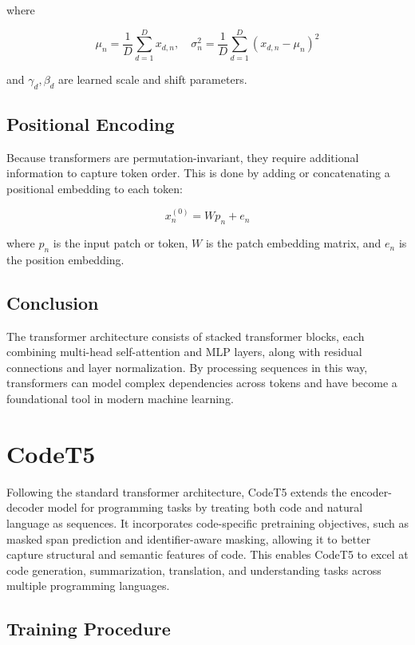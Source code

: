 \documentclass{article}
\begin{document}
where

\[
\mu_n = \frac{1}{D} \sum_{d=1}^D x_{d,n}, \quad \sigma_n^2 = \frac{1}{D} \sum_{d=1}^D (x_{d,n} - \mu_n)^2
\]

and \( \gamma_d, \beta_d \) are learned scale and shift parameters.

\subsection{Positional Encoding}

Because transformers are permutation-invariant, they require additional information to capture token order. This is done by adding or concatenating a positional embedding to each token:

\[
x_n^{(0)} = W p_n + e_n
\]

where \( p_n \) is the input patch or token, \( W \) is the patch embedding matrix, and \( e_n \) is the position embedding. \cite{turner2024introductiontransformers}

\subsection{Conclusion}

The transformer architecture consists of stacked transformer blocks, each combining multi-head self-attention and MLP layers, along with residual connections and layer normalization. By processing sequences in this way, transformers can model complex dependencies across tokens and have become a foundational tool in modern machine learning.

\section{CodeT5}
Following the standard transformer architecture, CodeT5 extends the encoder-decoder model for programming tasks by treating both code and natural language as sequences. It incorporates code-specific pretraining objectives, such as masked span prediction and identifier-aware masking, allowing it to better capture structural and semantic features of code. This enables CodeT5 to excel at code generation, summarization, translation, and understanding tasks across multiple programming languages. 

\subsection{Training Procedure}
\end{document}
